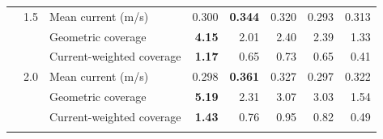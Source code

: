 \begin{table}[p]
\begin{tabular*}{\textwidth}{@{\extracolsep{\fill}}rrlrrrrr@{}}
\addlinespace[1pt]
\midrule
60 & 1.5 & Mean current (m/s) & 0.300 & \textbf{0.344} & 0.320 & 0.293 & 0.313 \\
 &  & Geometric coverage & \textbf{4.15} & 2.01 & 2.40 & 2.39 & 1.33 \\
 &  & Current-weighted coverage & \textbf{1.17} & 0.65 & 0.73 & 0.65 & 0.41 \\
\addlinespace[1pt]
60 & 2.0 & Mean current (m/s) & 0.298 & \textbf{0.361} & 0.327 & 0.297 & 0.322 \\
 &  & Geometric coverage & \textbf{5.19} & 2.31 & 3.07 & 3.03 & 1.54 \\
 &  & Current-weighted coverage & \textbf{1.43} & 0.76 & 0.95 & 0.82 & 0.49 \\
\addlinespace[1pt]
\bottomrule
\end{tabular*}
\end{table}
